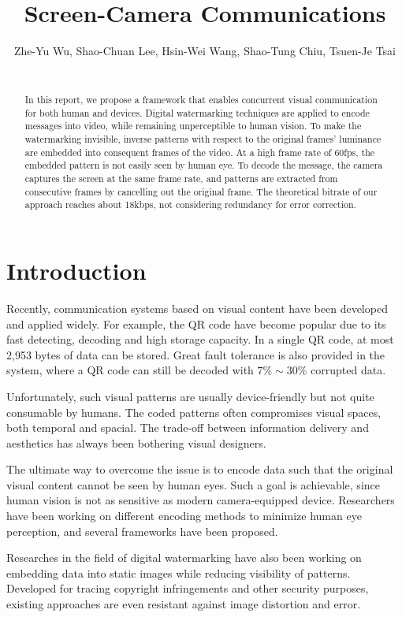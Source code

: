 \documentclass{acm_proc_article-sp}
\title{Screen-Camera Communications}
\subtitle{}
\author{
    Zhe-Yu Wu, Shao-Chuan Lee, Hsin-Wei Wang, Shao-Tung Chiu, Tsuen-Je Tsai \\
    \affaddr{B02902125, B01902010, B01902048, B01902085, B01902138} \\
    \email{\{B02902125, B01902010, B01902048, B01902085, B01902138\}@csie.ntu.edu.tw}
}
\begin{document}
\maketitle

\begin{abstract}
In this report, we propose a framework that enables concurrent visual communication for both human and devices. Digital watermarking techniques are applied to encode messages into video, while remaining unperceptible to human vision. To make the watermarking invisible, inverse patterns with respect to the original frames' luminance are embedded into consequent frames of the video. At a high frame rate of 60fps, the embedded pattern is not easily seen by human eye. To decode the message, the camera captures the screen at the same frame rate, and patterns are extracted from consecutive frames by cancelling out the original frame. The theoretical bitrate of our approach reaches about 18kbps, not considering redundancy for error correction.
\end{abstract}

\section{Introduction}
Recently, communication systems based on visual content have been developed and applied widely. For example, the QR code have become popular due to its fast detecting, decoding and high storage capacity. In a single QR code, at most 2,953 bytes of data can be stored. Great fault tolerance is also provided in the system, where a QR code can still be decoded with $7\%\sim30\%$ corrupted data.

Unfortunately, such visual patterns are usually device-friendly but not quite consumable by humans. The coded patterns often compromises visual spaces, both temporal and spacial. The trade-off between information delivery and aesthetics has always been bothering visual designers.

The ultimate way to overcome the issue is to encode data such that the original visual content cannot be seen by human eyes. Such a goal is achievable, since human vision is not as sensitive as modern camera-equipped device. Researchers have been working on different encoding methods to minimize human eye perception, and several frameworks have been proposed.

Researches in the field of digital watermarking have also been working on embedding data into static images while reducing visibility of patterns. Developed for tracing copyright infringements and other security purposes, existing approaches are even resistant against image distortion and error.
\end{document}
